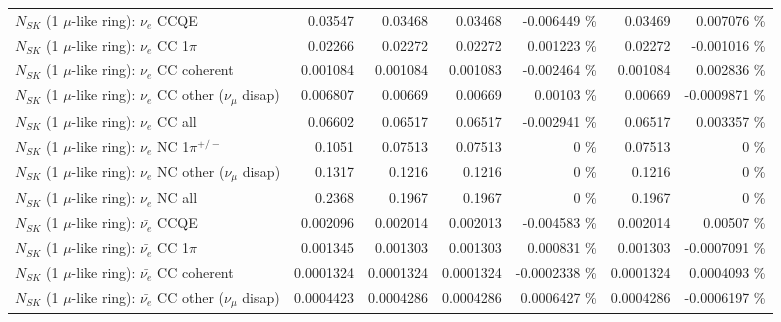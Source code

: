 \begin{table}
\begin{tabular}{| l | r | r | r  r | r  r |}
\hline
\hline
\hline
                                      $N_{SK}$ (1 $\mu$-like ring): $\nu_e$ CCQE &         0.03547 &         0.03468 &         0.03468 & -0.006449 \%  &         0.03469 & 0.007076 \%  \\ 
                                 $N_{SK}$ (1 $\mu$-like ring): $\nu_e$ CC 1$\pi$ &         0.02266 &         0.02272 &         0.02272 & 0.001223 \%  &         0.02272 & -0.001016 \%  \\ 
                               $N_{SK}$ (1 $\mu$-like ring): $\nu_e$ CC coherent &        0.001084 &        0.001084 &        0.001083 & -0.002464 \%  &        0.001084 & 0.002836 \%  \\ 
                $N_{SK}$ (1 $\mu$-like ring): $\nu_e$ CC other ($\nu_\mu$ disap) &        0.006807 &         0.00669 &         0.00669 &  0.00103 \%  &         0.00669 & -0.0009871 \%  \\ 
                                  $N_{SK}$ (1 $\mu$-like ring): $\nu_{e}$ CC all &         0.06602 &         0.06517 &         0.06517 & -0.002941 \%  &         0.06517 & 0.003357 \%  \\ 
\hline
                           $N_{SK}$ (1 $\mu$-like ring): $\nu_e$ NC 1$\pi^{+/-}$ &          0.1051 &         0.07513 &         0.07513 &        0 \%  &         0.07513 &        0 \%  \\ 
                $N_{SK}$ (1 $\mu$-like ring): $\nu_e$ NC other ($\nu_\mu$ disap) &          0.1317 &          0.1216 &          0.1216 &        0 \%  &          0.1216 &        0 \%  \\ 
                                  $N_{SK}$ (1 $\mu$-like ring): $\nu_{e}$ NC all &          0.2368 &          0.1967 &          0.1967 &        0 \%  &          0.1967 &        0 \%  \\ 
\hline
\hline
\hline
                                $N_{SK}$ (1 $\mu$-like ring): $\bar{\nu_e}$ CCQE &        0.002096 &        0.002014 &        0.002013 & -0.004583 \%  &        0.002014 &  0.00507 \%  \\ 
                           $N_{SK}$ (1 $\mu$-like ring): $\bar{\nu_e}$ CC 1$\pi$ &        0.001345 &        0.001303 &        0.001303 & 0.000831 \%  &        0.001303 & -0.0007091 \%  \\ 
                         $N_{SK}$ (1 $\mu$-like ring): $\bar{\nu_e}$ CC coherent &       0.0001324 &       0.0001324 &       0.0001324 & -0.0002338 \%  &       0.0001324 & 0.0004093 \%  \\ 
          $N_{SK}$ (1 $\mu$-like ring): $\bar{\nu_e}$ CC other ($\nu_\mu$ disap) &       0.0004423 &       0.0004286 &       0.0004286 & 0.0006427 \%  &       0.0004286 & -0.0006197 \%  \\ 

\end{tabular}
\end{table}
